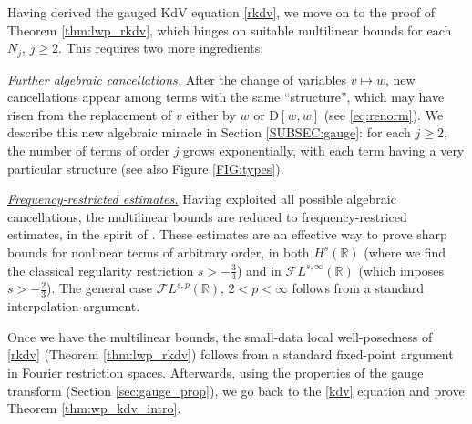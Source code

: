 \documentclass[a4paper,
11pt,  reqno]{amsart}
\newcommand{\5}{\textup{V}}
\newcommand{\noi}{\noindent}
\newcommand{\FL}{\mathcal{F} L}
\theoremstyle{remark}
\newcommand{\R}{\mathbb{R}}
\numberwithin{equation}{section}
\numberwithin{theorem}{section}
\newcommand{\D}{\mathrm{D}}
\begin{document}
	\medskip




	Having derived the gauged KdV equation \eqref{rkdv}, we move on to the proof of Theorem \ref{thm:lwp_rkdv}, which hinges on suitable multilinear bounds for each $N_j$, $j\ge 2$. This requires two more ingredients:

    \smallskip
    \noi\textit{\underline{Further algebraic cancellations.}} After the change of variables $v\mapsto w$, new cancellations appear among terms with the same ``structure'', which may have risen from the replacement of $v$ either by $w$ or $\D[w,w]$ (see \eqref{eq:renorm}). We describe this new algebraic miracle in Section \ref{SUBSEC:gauge}:
for each $j\ge 2$, the number of terms of order $j$ grows exponentially, with each term having a very particular structure (see also Figure \ref{FIG:types}).


    \smallskip
    \noi\textit{\underline{Frequency-restricted estimates.}} Having exploited all possible algebraic cancellations, the multilinear bounds are reduced to frequency-restriced estimates, in the spirit of \cite{CC24, CLS, COS}. These estimates are an effective way to prove sharp bounds for nonlinear terms of arbitrary order, in both $H^s(\R)$ (where we find the classical regularity restriction $s>-\frac34$) and in $\FL^{s,\infty}(\R)$ (which imposes $s>-\frac23$). The general case $\FL^{s,p}(\R)$, $2<p<\infty$ follows from a standard interpolation argument.

	\medskip


	Once we have the multilinear bounds, the small-data local well-posedness of \eqref{rkdv} (Theorem \ref{thm:lwp_rkdv}) follows from a standard fixed-point argument in Fourier restriction spaces. Afterwards, using the properties of the gauge transform (Section \ref{sec:gauge_prop}), we go back to the \eqref{kdv} equation and prove Theorem \ref{thm:wp_kdv_intro}.
\end{document}
